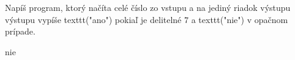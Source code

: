 




Napíš program, ktorý načíta celé číslo zo vstupu a na jediný riadok výstupu výstupu vypíše
texttt("ano") pokiaľ je delitelné $7$ a texttt("nie") v opačnom prípade.

\vystup
nie
\koniec


